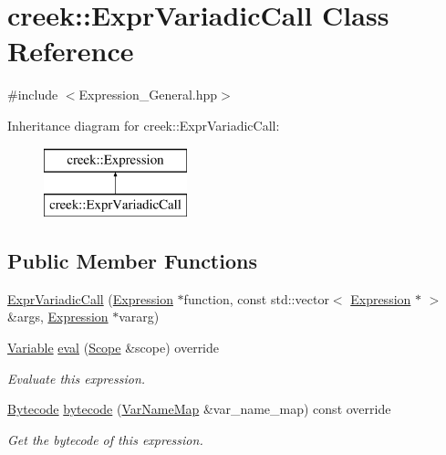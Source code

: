\hypertarget{classcreek_1_1_expr_variadic_call}{}\section{creek\+:\+:Expr\+Variadic\+Call Class Reference}
\label{classcreek_1_1_expr_variadic_call}


{\ttfamily \#include $<$Expression\+\_\+\+General.\+hpp$>$}

Inheritance diagram for creek\+:\+:Expr\+Variadic\+Call\+:\begin{figure}[H]
\begin{center}
\leavevmode
\includegraphics[height=2.000000cm]{classcreek_1_1_expr_variadic_call}
\end{center}
\end{figure}
\subsection*{Public Member Functions}
\begin{DoxyCompactItemize}
\item 
\hyperlink{classcreek_1_1_expr_variadic_call_af7ab7b4f046a0c62e1fa0411bc26d36a}{Expr\+Variadic\+Call} (\hyperlink{classcreek_1_1_expression}{Expression} $\ast$function, const std\+::vector$<$ \hyperlink{classcreek_1_1_expression}{Expression} $\ast$ $>$ \&args, \hyperlink{classcreek_1_1_expression}{Expression} $\ast$vararg)
\item 
\hyperlink{classcreek_1_1_variable}{Variable} \hyperlink{classcreek_1_1_expr_variadic_call_a5d797164553d7a1c631fa0a91a7656ad}{eval} (\hyperlink{classcreek_1_1_scope}{Scope} \&scope) override
\begin{DoxyCompactList}\small\item\em Evaluate this expression. \end{DoxyCompactList}\item 
\hyperlink{classcreek_1_1_bytecode}{Bytecode} \hyperlink{classcreek_1_1_expr_variadic_call_a20ca01fd0402510acdc08aadc4be2292}{bytecode} (\hyperlink{classcreek_1_1_var_name_map}{Var\+Name\+Map} \&var\+\_\+name\+\_\+map) const  override\hypertarget{classcreek_1_1_expr_variadic_call_a20ca01fd0402510acdc08aadc4be2292}{}\label{classcreek_1_1_expr_variadic_call_a20ca01fd0402510acdc08aadc4be2292}

\begin{DoxyCompactList}\small\item\em Get the bytecode of this expression. \end{DoxyCompactList}\end{DoxyCompactItemize}


